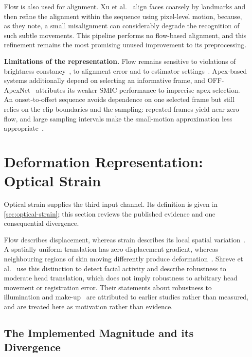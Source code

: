 Flow is also used for alignment. Xu et al.~\cite{xu2017} align faces coarsely by landmarks and then refine the alignment within the sequence using pixel-level motion, because, as they note, a small misalignment can considerably degrade the recognition of such subtle movements. This pipeline performs no flow-based alignment, and this refinement remains the most promising unused improvement to its preprocessing.

\textbf{Limitations of the representation.} Flow remains sensitive to violations of brightness constancy~\cite{horn1981}, to alignment error and to estimator settings~\cite{xu2017}. Apex-based systems additionally depend on selecting an informative frame, and OFF-ApexNet~\cite{liong2019a} attributes its weaker SMIC performance to imprecise apex selection. An onset-to-offset sequence avoids dependence on one selected frame but still relies on the clip boundaries and the sampling: repeated frames yield near-zero flow, and large sampling intervals make the small-motion approximation less appropriate~\cite{horn1981}.


\section{Deformation Representation: Optical Strain}
\label{sec:strain-review}

Optical strain supplies the third input channel. Its definition is given in \autoref{sec:optical-strain}; this section reviews the published evidence and one consequential divergence.

Flow describes displacement, whereas strain describes its local spatial variation~\cite{shreve2011,liong2016}. A spatially uniform translation has zero displacement gradient, whereas neighbouring regions of skin moving differently produce deformation~\cite{shreve2011}. Shreve et al.~\cite{shreve2011} use this distinction to detect facial activity and describe robustness to moderate head translation, which does not imply robustness to arbitrary head movement or registration error. Their statements about robustness to illumination and make-up~\cite{shreve2011} are attributed to earlier studies rather than measured, and are treated here as motivation rather than evidence.

\subsection{The Implemented Magnitude and its Divergence}
\label{sec:strain-divergence}

